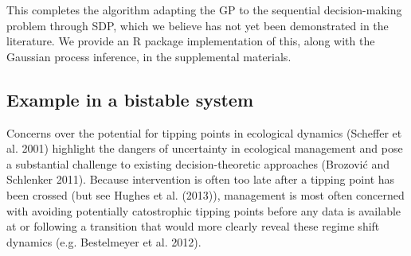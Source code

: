 \documentclass[author-year, review]{elsarticle} %
\newenvironment{Shaded}{}{}
\newcommand{\KeywordTok}[1]{\textcolor[rgb]{0.00,0.44,0.13}{\textbf{{#1}}}}
\newcommand{\DataTypeTok}[1]{\textcolor[rgb]{0.56,0.13,0.00}{{#1}}}
\newcommand{\DecValTok}[1]{\textcolor[rgb]{0.25,0.63,0.44}{{#1}}}
\newcommand{\StringTok}[1]{\textcolor[rgb]{0.25,0.44,0.63}{{#1}}}
\newcommand{\CommentTok}[1]{\textcolor[rgb]{0.38,0.63,0.69}{\textit{{#1}}}}
\newcommand{\NormalTok}[1]{{#1}}
\begin{document}
\begin{Shaded}
\end{Shaded}

This completes the algorithm adapting the GP to the sequential
decision-making problem through SDP, which we believe has not yet been
demonstrated in the literature. We provide an R package implementation
of this, along with the Gaussian process inference, in the supplemental
materials.

\subsection{Example in a bistable system}

Concerns over the potential for tipping points in ecological dynamics
(Scheffer et al. 2001) highlight the dangers of uncertainty in
ecological management and pose a substantial challenge to existing
decision-theoretic approaches (Brozović and Schlenker 2011). Because
intervention is often too late after a tipping point has been crossed
(but see Hughes et al. (2013)), management is most often concerned with
avoiding potentially catostrophic tipping points before any data is
available at or following a transition that would more clearly reveal
these regime shift dynamics (e.g. Bestelmeyer et al. 2012).
\end{document}
